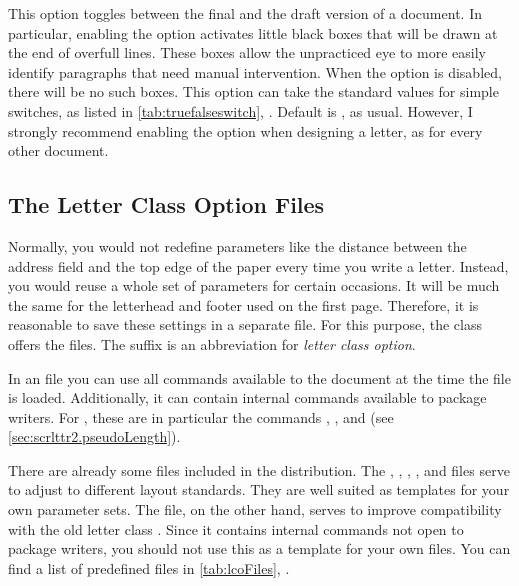 \begin{Declaration}
\end{Declaration}
%
This option toggles between the final and the
draft version of a document. In particular,
enabling the  option activates little black boxes that
will be drawn at the end of overfull lines. These boxes allow the
unpracticed eye to more easily identify paragraphs that need manual
intervention. When the  option is disabled, there will
be no such boxes. This option can take the standard values for simple
switches, as listed in \autoref{tab:truefalseswitch},
.  Default is
, as usual. However, I strongly recommend enabling the
 option when designing a letter, as for every other
document.
%
%

\subsection{The Letter Class Option Files}
\label{sec:scrlttr2.lcoFile}

%
Normally, you would not redefine parameters like the distance between
the address field and the top edge of the paper every time you write a
letter. Instead, you would reuse a whole set of parameters for certain
occasions. It will be much the same for the letterhead and footer used
on the first page. Therefore, it is reasonable to save these settings
in a separate file. For this purpose, the  class
offers the  files. The  suffix is an abbreviation
for \emph{\emph{l}etter \emph{c}lass \emph{o}ption}.

In an  file you can use all commands available to the
document at the time the  file is loaded.  Additionally, it
can contain internal commands available to package writers. For
, these are in particular the commands
, , and 
(see \autoref{sec:scrlttr2.pseudoLength}).

There are already some  files included in the {\KOMAScript}
distribution. The , , ,
, and  files
serve to adjust {\KOMAScript} to different layout standards. They are well
suited as templates for your own parameter sets. The  file,
on the other hand, serves to improve compatibility with the old letter class
.  Since it contains internal commands not open to package
writers, you should not use this as a template for your own 
files. You can find a list of predefined  files in
\autoref{tab:lcoFiles}, .

